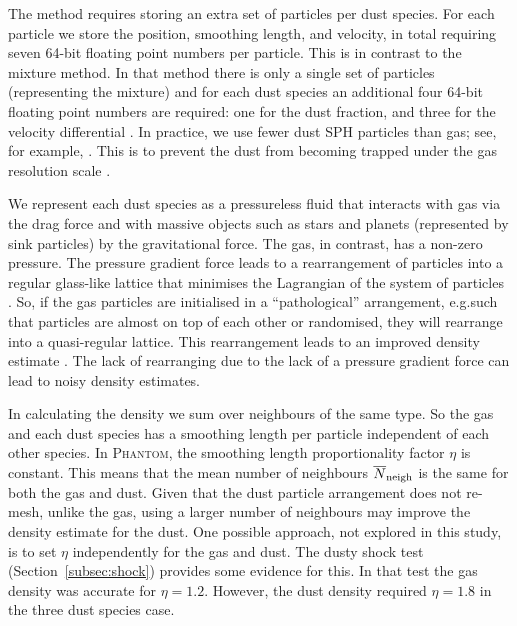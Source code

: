 \documentclass[fleqn,usenatbib]{mnras}
\begin{document}
The method requires storing an extra set of particles per dust species. For each
particle we store the position, smoothing length, and velocity, in total
requiring seven 64-bit floating point numbers per particle. This is in contrast
to the mixture method. In that method there is only a single set of particles
(representing the mixture) and for each dust species an additional four 64-bit
floating point numbers are required: one for the dust fraction, and three for
the velocity differential \citep{Hutchison2018MNRAS.476.2186H}. In practice, we
use fewer dust SPH particles than gas; see, for example,
\citet{Dipierro2015MNRAS.453L..73D, Mentiplay2019MNRAS.484L.130M,
Calcino2019MNRAS.490.2579C}. This is to prevent the dust from becoming trapped
under the gas resolution scale \citep{Laibe2012MNRAS.420.2345L}.

We represent each dust species as a pressureless fluid that interacts with gas
via the drag force and with massive objects such as stars and planets
(represented by sink particles) by the gravitational force. The gas, in
contrast, has a non-zero pressure. The pressure gradient force leads to a
rearrangement of particles into a regular glass-like lattice
\citep{Monaghan2005RPPh...68.1703M} that minimises the Lagrangian of the system
of particles \citep{Price2012JCoPh.231..759P}. So, if the gas particles are
initialised in a ``pathological'' arrangement, e.g.\@ such that particles are
almost on top of each other or randomised, they will rearrange into a
quasi-regular lattice. This rearrangement leads to an improved density estimate
\citep{Price2012JCoPh.231..759P}. The lack of rearranging due to the lack of a
pressure gradient force can lead to noisy density estimates.

In calculating the density we sum over neighbours of the same type. So the gas
and each dust species has a smoothing length per particle independent of each
other species. In \textsc{Phantom}, the smoothing length proportionality factor
\(\eta\) is constant. This means that the mean number of neighbours
\(\overline{N}_{\rm neigh}\) is the same for both the gas and dust. Given that
the dust particle arrangement does not re-mesh, unlike the gas, using a larger
number of neighbours may improve the density estimate for the dust. One possible
approach, not explored in this study, is to set \(\eta\) independently for the
gas and dust. The dusty shock test (Section~\ref{subsec:shock}) provides some
evidence for this. In that test the gas density was accurate for \(\eta = 1.2\).
However, the dust density required \(\eta = 1.8\) in the three dust species
case.
\end{document}
